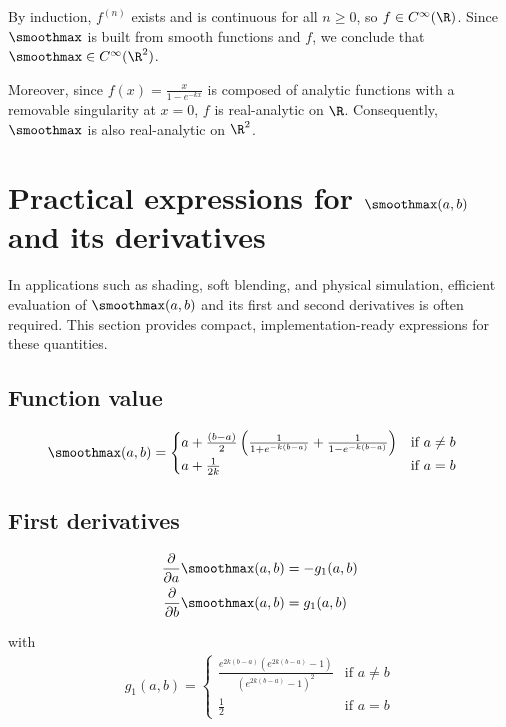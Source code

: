By induction, $f^{(n)}$ exists and is continuous for all $n \geq 0$, so $f \in C^\infty(\R)$. Since $\smoothmax$ is built from smooth functions and $f$, we conclude that $\smoothmax \in C^\infty(\R^2)$.

\smallConclusion

Moreover, since $f(x) = \frac{x}{1 - e^{-kx}}$ is composed of analytic functions with a removable singularity at $x = 0$, $f$ is real-analytic on $\R$. Consequently, $\smoothmax$ is also real-analytic on $\R^2$.

\section{Practical expressions for $\smoothmax(a, b)$ and its derivatives}
\label{sec:smoothmax-practical-forms}

In applications such as shading, soft blending, and physical simulation, efficient evaluation of $\smoothmax(a, b)$ and its first and second derivatives is often required. This section provides compact, implementation-ready expressions for these quantities.

\subsection*{Function value}
\begin{align}
    \smoothmax(a, b) &= \begin{cases}
        a + \frac{(b - a)}{2} \left( \frac{1}{1 + e^{-k(b-a)}} + \frac{1}{1 - e^{-k(b-a)}} \right) &\text{if } a \neq b \\
        a + \frac{1}{2k} &\text{if } a = b
    \end{cases}
\end{align}

\subsection*{First derivatives}
\begin{align}
    \frac{\partial}{\partial a} \smoothmax(a, b) &= - g_1(a, b) \\
    \frac{\partial}{\partial b} \smoothmax(a, b) &= g_1(a, b)
\end{align}

with 
\begin{align}
    g_1(a, b) = \begin{cases}
        \frac{e^{2k(b-a)}\left(e^{2k(b-a)} - 1\right)}{\left(e^{2k(b-a)}-1\right)^2} &\text{if } a \neq b \\
        \frac{1}{2} &\text{if } a = b
    \end{cases}
\end{align}

